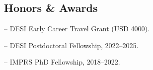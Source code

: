 \documentclass[12pt,letterpaper]{article}
\begin{document}


\subsection{Honors \& Awards}
\begin{list}{}{\cvlist}
  \item -- DESI Early Career Travel Grant (USD 4000).
  \item -- DESI Postdoctoral Fellowship, 2022--2025.
  \item -- IMPRS PhD Fellowship, 2018--2022.
\end{list}
\end{document}
